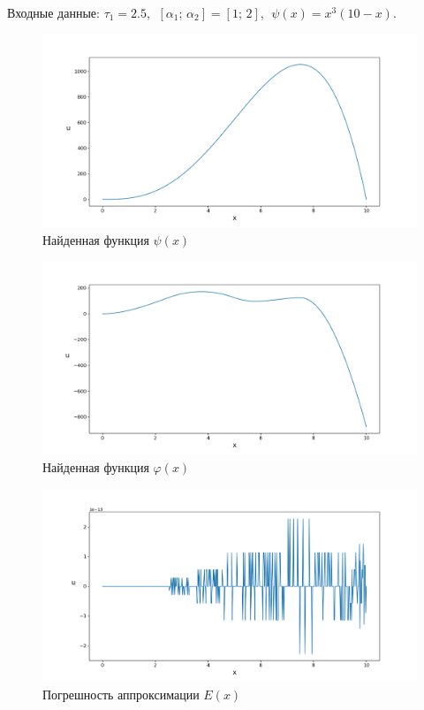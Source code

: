 \documentclass{article}
\theoremstyle{definition}
\begin{document}
Входные данные: 
$\tau_1 = 2.5$, $\;[\alpha_1;\, \alpha_2] = [1;\, 2]$, $\;\psi(x) = x^3(10 - x)$.
\begin{figure}[H]
	\centering
	\includegraphics[trim={2.02cm, 0, 0, 1.5cm}, clip, scale=0.61]{3_psi.png}
	\caption{Найденная функция $\psi(x)$}
	\label{fig:image7}
\end{figure}
\begin{figure}[H]
	\centering
	\includegraphics[trim={2.02cm, 0, 0, 1.5cm}, clip, scale=0.61]{3_u0.png}
	\caption{Найденная функция $\varphi(x)$}
	\label{fig:image8}
\end{figure}

\begin{figure}[H]
	\centering
	\includegraphics[trim={2.1cm, 0, 0, 1.5cm}, clip, scale=0.61]{3_E.png}
	\caption{Погрешность аппроксимации $E(x)$}
	\label{fig:image9}
\end{figure}
\end{document}
